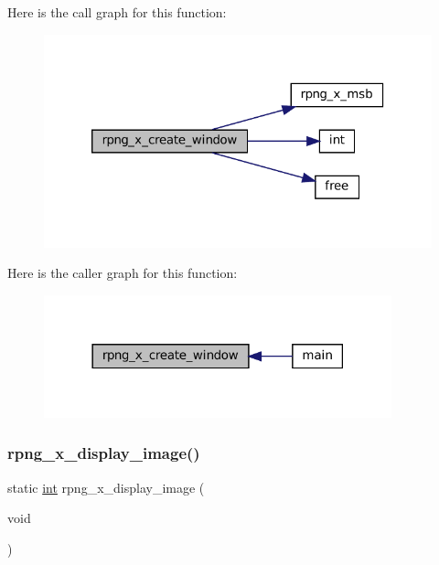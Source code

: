 Here is the call graph for this function\+:
\nopagebreak
\begin{figure}[H]
\begin{center}
\leavevmode
\includegraphics[width=320pt]{rpng-x_8c_aa0248c83cb58e449c3bfadfa665a5e3a_cgraph}
\end{center}
\end{figure}
Here is the caller graph for this function\+:
\nopagebreak
\begin{figure}[H]
\begin{center}
\leavevmode
\includegraphics[width=285pt]{rpng-x_8c_aa0248c83cb58e449c3bfadfa665a5e3a_icgraph}
\end{center}
\end{figure}
\mbox{\label{rpng-x_8c_a764dae146d760f0ef544cde7191396ca}} 
\subsubsection{\texorpdfstring{rpng\+\_\+x\+\_\+display\+\_\+image()}{rpng\_x\_display\_image()}}
{\footnotesize\ttfamily static \mbox{\hyperlink{ioapi_8h_a787fa3cf048117ba7123753c1e74fcd6}{int}} rpng\+\_\+x\+\_\+display\+\_\+image (\begin{DoxyParamCaption}\item[{void}]{ }\end{DoxyParamCaption})\hspace{0.3cm}{\ttfamily [static]}}

